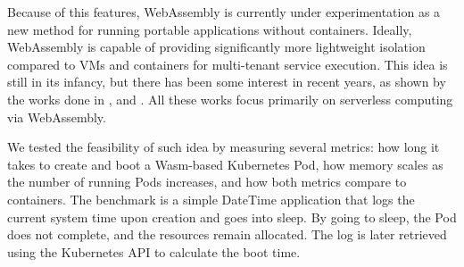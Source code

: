 


Because of this features, WebAssembly is currently under experimentation as a new method for running portable applications without containers. Ideally, WebAssembly is capable of providing significantly more lightweight isolation compared to VMs and containers for multi-tenant service execution. This idea is still in its infancy, but there has been some interest in recent years, as shown by the works done in \cite{hall2019execution}, \cite{gadepalli2020sledge} and \cite{shillaker2020faasm}. All these works focus primarily on serverless computing via WebAssembly.

We tested the feasibility of such idea by measuring several metrics: how long it takes to create and boot a Wasm-based Kubernetes Pod, how memory scales as the number of running Pods increases, and how both metrics compare to containers. The benchmark is a simple DateTime application that logs the current system time upon creation and goes into sleep. By going to sleep, the Pod does not complete, and the resources remain allocated. The log is later retrieved using the Kubernetes API to calculate the boot time. 

